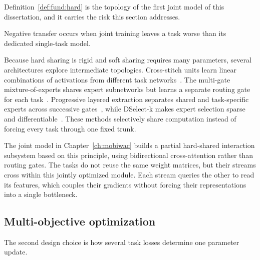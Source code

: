 Definition~\ref{def:fund:hard} is the topology of the first joint model of this
dissertation, and it carries the risk this section addresses.

\begin{definition}\label{def:fund:negtransfer}
Negative transfer occurs when joint training leaves a task worse than its dedicated
single-task model.
\end{definition}

Because hard sharing is rigid and soft sharing requires many parameters, several
architectures explore intermediate topologies. Cross-stitch units learn linear
combinations of activations from different task networks~\cite{misra2016cross}.
The multi-gate mixture-of-experts shares expert subnetworks but learns a
separate routing gate for each task~\cite{ma2018mmoe}. Progressive layered
extraction separates shared and task-specific experts across successive
gates~\cite{tang2020ple}, while DSelect-k makes expert selection sparse and
differentiable~\cite{hazimeh2021dselectk}. These methods selectively share
computation instead of forcing every task through one fixed trunk.

The joint model in Chapter~\ref{ch:mobiwac} builds a partial hard-shared interaction
subsystem based on this principle, using bidirectional cross-attention rather than
routing gates. The tasks do not reuse the same weight matrices, but their streams
cross within this jointly optimized module. Each stream queries the other to read its
features, which couples their gradients without forcing their representations into a
single bottleneck.

\subsection{Multi-objective optimization}

The second design choice is how several task losses determine one parameter update.

